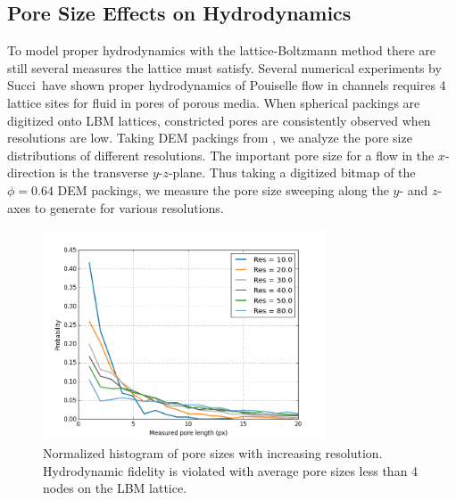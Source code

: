 \subsection{Pore Size Effects on Hydrodynamics}
To model proper hydrodynamics with the lattice-Boltzmann method there are still several measures the lattice must satisfy. Several numerical experiments by Succi\etal~have shown proper hydrodynamics of Pouiselle flow in channels requires 4 lattice sites for fluid in pores of porous media.\cite{succi2001lattice} When spherical packings are digitized onto LBM lattices, constricted pores are consistently observed when resolutions are low. Taking DEM packings from , we analyze the pore size distributions of different resolutions. The important pore size for a flow in the $x$-direction is the transverse $y$-$z$-plane. Thus taking a digitized bitmap of the $\phi = 0.64$  DEM packings, we measure the pore size sweeping along the $y$- and $z$-axes to generate  for various resolutions. 

\begin{figure}[h]
    \centering
    \includegraphics[width=0.75\textwidth]{figures/lbm/res-pore-sizes}
    \caption{Normalized histogram of pore sizes with increasing resolution. Hydrodynamic fidelity is violated with average pore sizes less than 4 nodes on the LBM lattice.}\label{fig:res-pore-sizes}
\end{figure}

